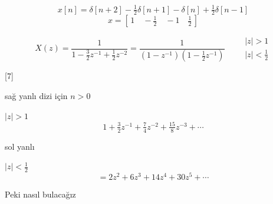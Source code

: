 \documentclass[11pt,a4paper]{article}
\begin{document}
\[ x[n] = \delta[n+2] - \tfrac12\delta[n+1] - \delta[n] + \tfrac12\delta[n-1] \]
\[ x = \left[\,1 \quad -\tfrac12 \quad -1 \quad \tfrac12\,\right] \]

\[ X(z) = \frac{1}{1-\frac32 z^{-1}+\frac12 z^{-2}} = \frac{1}{(1-z^{-1})\left(1-\frac12 z^{-1}\right)} \qquad \begin{matrix} |z|>1 \\ |z|<\frac12 \end{matrix} \]

[7]

sağ yanlı dizi için $n>0$

$|z|>1$ 
\[ 1 + \tfrac32 z^{-1} + \tfrac74 z^{-2} + \tfrac{15}{8} z^{-3} + \cdots \]

sol yanlı

$|z|<\frac12$
\[ = 2z^{2} + 6z^{3} + 14z^{4} + 30z^{5} + \cdots \]

Peki nasıl bulacağız
\end{document}

